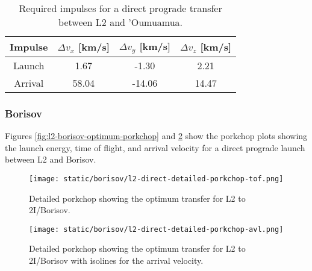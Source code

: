 \vspace{1cm}
\begin{table}[H]
  \centering
  \begin{tabular}{|c|c|c|c|}
    \hline
    Impulse & $\Delta v_x$ [km/s] & $\Delta v_y$ [km/s] & $\Delta v_z$ [km/s] \\
    \hline
    Launch & 1.67 & -1.30 & 2.21 \\
    \hline
    Arrival & 58.04 & -14.06 & 14.47 \\
    \hline
  \end{tabular}
    \caption[Required impulses for a direct prograde transfer between L2 and
    'Oumuamua]{Required impulses for a direct prograde transfer between L2 and
    'Oumuamua.}
  \label{tab:l2-oumuamua-direct-transfer-impulses}
\end{table}


\subsubsection{Borisov}

Figures \ref{fig:l2-borisov-optimum-porkchop} and
\ref{fig:l2-borisov-optimum-porkchop-avl} show the porkchop plots showing the
launch energy, time of flight, and arrival velocity for a direct prograde launch
between L2 and Borisov.

\begin{figure}[H]
  \centering
  \texttt{[image: static/borisov/l2-direct-detailed-porkchop-tof.png]}
        \caption[Detailed porkchop showing the optimum transfer for
        L2 to 2I/Borisov with the time of flight.]{Detailed porkchop showing the optimum transfer for
        L2 to 2I/Borisov. 
  }
  \label{fig:l2-oumuamua-optimum-porkchop}
\end{figure}

\begin{figure}[H]
  \centering
  \texttt{[image: static/borisov/l2-direct-detailed-porkchop-avl.png]}
        \caption[Detailed porkchop showing the optimum transfer for
        L2 to 2I/Borisov with the arrival velocity.]{Detailed porkchop showing the
        optimum transfer for L2 to 2I/Borisov with isolines for the arrival
        velocity.}
  \label{fig:l2-borisov-optimum-porkchop-avl}
\end{figure}

















